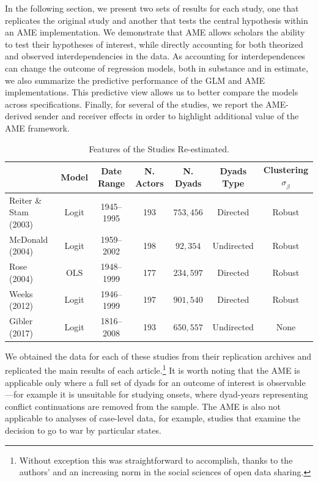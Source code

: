 \documentclass{article}[12pt]
\begin{document}
In the following section, we present two sets of results for each
study, one that replicates the original study and another that tests
the central hypothesis within an AME implementation. We demonstrate
that AME allows scholars the ability to test their hypotheses of
interest, while directly accounting for both theorized and observed interdependencies in the
data. As accounting for interdependences can change the outcome
of regression models, both in substance and in estimate, we also summarize the
predictive performance of the GLM and AME implementations. This
predictive view allows us to better compare the models across
specifications. Finally, for several of the studies, we report the
AME-derived sender and receiver effects in order to highlight
additional value of the AME framework.


\begin{table}
\caption{Features of the Studies Re-estimated.}
	\begin{tabular}{lcccccc}
		& Model &  Date Range & N. Actors  & N. Dyads & Dyads Type & Clustering $\sigma_{\hat{\beta}}$ \\ \toprule
		Reiter \& Stam (2003) &Logit &1945--1995 &  193 & $753,456$ & Directed & Robust \\	
		McDonald (2004) & Logit &1959--2002 & 198 & $92,354$ & Undirected & Robust\\
		Rose (2004) & OLS & 1948--1999 & 177 & $234,597$ & Directed & Robust \\	 
		Weeks (2012) & Logit & 1946--1999 &197 &  $901,540$ & Directed & Robust \\
		Gibler (2017) & Logit & 1816--2008 &193 &   $650,557$ & Undirected & None \\ \bottomrule
	\end{tabular}
\end{table}

We obtained the data for each of these studies from their replication
archives and replicated the main results of each
article.\footnote{Without exception this was straightforward to
  accomplish, thanks to the authors'  and an increasing norm in the social sciences of
  open data sharing.}  It is worth noting that the AME is applicable
only where a full set of dyads for an outcome of interest is
observable---for example it is unsuitable for studying onsets, where
dyad-years representing conflict continuations are removed from the
sample. The AME is also not applicable to analyses of case-level data,
for example, studies that examine the decision to go to war by
particular states.
\end{document}
